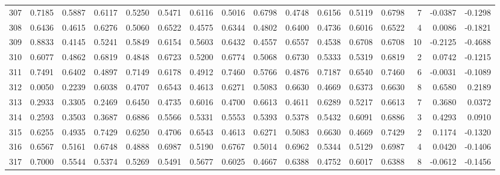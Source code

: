 \begin{tabular}{lrrrrrrrrrrrrrrr}
307 &      0.7185 &  0.5887 &  0.6117 &  0.5250 &  0.5471 &  0.6116 &  0.5016 &  0.6798 &  0.4748 &  0.6156 &   0.5119 &     0.6798 &      7 &                   -0.0387 &                    -0.1298 \\
308 &      0.6436 &  0.4615 &  0.6276 &  0.5060 &  0.6522 &  0.4575 &  0.6344 &  0.4802 &  0.6400 &  0.4736 &   0.6016 &     0.6522 &      4 &                    0.0086 &                    -0.1821 \\
309 &      0.8833 &  0.4145 &  0.5241 &  0.5849 &  0.6154 &  0.5603 &  0.6432 &  0.4557 &  0.6557 &  0.4538 &   0.6708 &     0.6708 &     10 &                   -0.2125 &                    -0.4688 \\
310 &      0.6077 &  0.4862 &  0.6819 &  0.4848 &  0.6723 &  0.5200 &  0.6774 &  0.5068 &  0.6730 &  0.5333 &   0.5319 &     0.6819 &      2 &                    0.0742 &                    -0.1215 \\
311 &      0.7491 &  0.6402 &  0.4897 &  0.7149 &  0.6178 &  0.4912 &  0.7460 &  0.5766 &  0.4876 &  0.7187 &   0.6540 &     0.7460 &      6 &                   -0.0031 &                    -0.1089 \\
312 &      0.0050 &  0.2239 &  0.6038 &  0.4707 &  0.6543 &  0.4613 &  0.6271 &  0.5083 &  0.6630 &  0.4669 &   0.6373 &     0.6630 &      8 &                    0.6580 &                     0.2189 \\
313 &      0.2933 &  0.3305 &  0.2469 &  0.6450 &  0.4735 &  0.6016 &  0.4700 &  0.6613 &  0.4611 &  0.6289 &   0.5217 &     0.6613 &      7 &                    0.3680 &                     0.0372 \\
314 &      0.2593 &  0.3503 &  0.3687 &  0.6886 &  0.5566 &  0.5331 &  0.5553 &  0.5393 &  0.5378 &  0.5432 &   0.6091 &     0.6886 &      3 &                    0.4293 &                     0.0910 \\
315 &      0.6255 &  0.4935 &  0.7429 &  0.6250 &  0.4706 &  0.6543 &  0.4613 &  0.6271 &  0.5083 &  0.6630 &   0.4669 &     0.7429 &      2 &                    0.1174 &                    -0.1320 \\
316 &      0.6567 &  0.5161 &  0.6748 &  0.4888 &  0.6987 &  0.5190 &  0.6767 &  0.5014 &  0.6962 &  0.5344 &   0.5129 &     0.6987 &      4 &                    0.0420 &                    -0.1406 \\
317 &      0.7000 &  0.5544 &  0.5374 &  0.5269 &  0.5491 &  0.5677 &  0.6025 &  0.4667 &  0.6388 &  0.4752 &   0.6017 &     0.6388 &      8 &                   -0.0612 &                    -0.1456 \\

\end{tabular}
